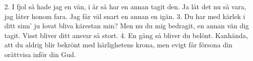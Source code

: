 2.  I fjol så hade jag en vän,
    i år så har en annan tagit den.
    Ja låt det nu så vara,
    jag låter honom fara.
    Jag får väl snart en annan en igän.
3.  Du har med kärlek i ditt sinn'
    ju lovat bliva kärestan min?
    Men nu du mig bedragit,
    en annan vän dig tagit.
    Visst bliver ditt ansvar så stort.
4.  En gång så bliver du belönt.
    Kanhända, att du aldrig blir bekrönt
    med härlighetens krona,
    men evigt får försona
    din orättvisa inför din Gud.
